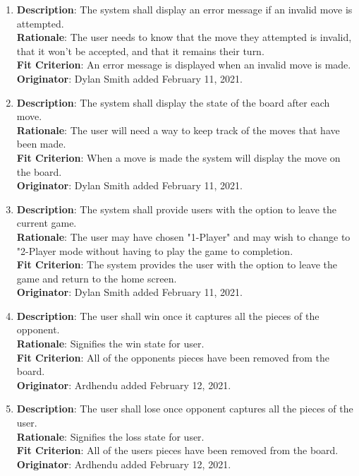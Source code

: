 \documentclass[12pt, titlepage]{article}
\begin{document}
\begin{enumerate}[{FR}1.]
    \item\textbf{Description}: The system shall display an error message if an invalid move is attempted.\\
        \textbf{Rationale}: The user needs to know that the move they attempted is invalid, that it won't be accepted, and that it remains their turn.\\
        \textbf{Fit Criterion}: An error message is displayed when an invalid move is made.\\
        \textbf{Originator}: Dylan Smith added February 11, 2021.
        
    \item\textbf{Description}: The system shall display the state of the board after each move.\\
        \textbf{Rationale}: The user will need a way to keep track of the moves that have been made.\\
        \textbf{Fit Criterion}: When a move is made the system will display the move on the board.\\
        \textbf{Originator}: Dylan Smith added February 11, 2021.
        
    \item\textbf{Description}: The system shall provide users with the option to leave the current game.\\
        \textbf{Rationale}: The user may have chosen "1-Player" and may wish to change to "2-Player mode without having to play the game to completion.\\
        \textbf{Fit Criterion}: The system provides the user with the option to leave the game and return to the home screen.\\
        \textbf{Originator}: Dylan Smith added February 11, 2021.
        
    \item\textbf{Description}: The user shall win once it captures all the pieces of the opponent.\\
        \textbf{Rationale}: Signifies the win state for user.\\
        \textbf{Fit Criterion}: All of the opponents pieces have been removed from the board.\\
        \textbf{Originator}: Ardhendu added February 12, 2021.
        
    \item\textbf{Description}: The user shall lose once opponent captures all the pieces of the user.\\
        \textbf{Rationale}: Signifies the loss state for user.\\
        \textbf{Fit Criterion}: All of the users pieces have been removed from the board.\\
        \textbf{Originator}: Ardhendu added February 12, 2021.
        

\end{enumerate}
\end{document}
